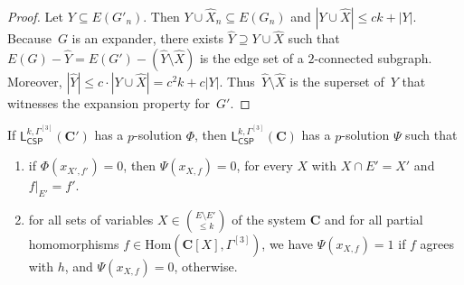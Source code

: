 \documentclass[a4paper,english, thm-restate]{lipics-v2021}
\newcommand{\StructC}{\mathbf{C}}
\newcommand{\Hom}[2]{\mathrm{Hom}(#1,#2)}
\newcommand{\leqs}{\mathsf{L}}
\newcommand{\cspiso}[3]{\leqs^{#1,#2}_{\mathsf{CSP}}(#3)}
\newcommand{\CosetGrpTmplt}[2]{#1^{[#2]}}
\begin{document}
	\begin{proof}
		Let $Y \subseteq E(G'_n)$. Then $Y \cup \hat{X}_n \subseteq E(G_n)$ and $|Y \cup \hat{X}| \leq ck + |Y|$. Because~$G$ is an expander, there exists $\hat{Y} \supseteq Y \cup \hat{X}$ such that $E(G) - \hat{Y} = E(G')-(\hat{Y} \setminus \hat{X})$ is the edge set of a $2$-connected subgraph. Moreover, $|\hat{Y}| \leq c \cdot |Y \cup \hat{X}| = c^2k+c|Y|$. Thus~$\hat{Y} \setminus \hat{X}$ is the superset of~$Y$ that witnesses the expansion property for~$G'$. 
	\end{proof}	
	
	
	
	
	\begin{lemma}
		\label{lem:piecingTogetherPhiAndSolution}
		If $\cspiso{k}{\CosetGrpTmplt{\Gamma}{3}}{\StructC'}$ has a $p$-solution $\Phi$, then $\cspiso{k}{\CosetGrpTmplt{\Gamma}{3}}{\StructC}$ has a $p$-solution $\Psi$ such that
		\begin{enumerate}
			\item if $\Phi(x_{X',f'}) = 0$, then $\Psi(x_{X,f}) = 0$, for every $X$ with $X \cap E' = X'$ and $f|_{E'} = f'$.
			\item  for all sets of variables $X \in \binom{E \setminus E'}{\leq k}$ of the system $\StructC$ and for all partial homomorphisms $f \in \Hom{\StructC[X]}{\CosetGrpTmplt{\Gamma}{3}}$,
			we have $\Psi(x_{X,f}) = 1$ if $f$ agrees with $h$, and $\Psi(x_{X,f}) = 0$, otherwise.
		\end{enumerate}
	\end{lemma}	
\end{document}
